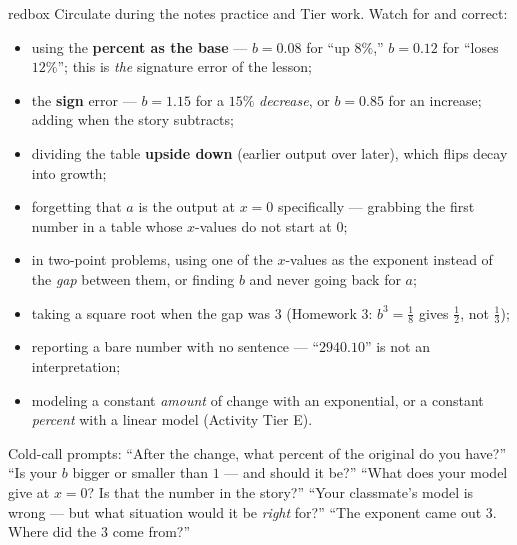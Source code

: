 \documentclass[10pt]{article}
\begin{document}
\begin{skillbox}{redbox}
Circulate during the notes practice and Tier work. Watch for and correct:
\begin{itemize}[leftmargin=1.2em, nosep]
  \item using the \textbf{percent as the base} --- $b=0.08$ for ``up $8\%$,'' $b=0.12$ for ``loses $12\%$''; this is \emph{the} signature error of the lesson;
  \item the \textbf{sign} error --- $b=1.15$ for a $15\%$ \emph{decrease}, or $b=0.85$ for an increase; adding when the story subtracts;
  \item dividing the table \textbf{upside down} (earlier output over later), which flips decay into growth;
  \item forgetting that $a$ is the output at $x=0$ specifically --- grabbing the first number in a table whose $x$-values do not start at $0$;
  \item in two-point problems, using one of the $x$-values as the exponent instead of the \emph{gap} between them, or finding $b$ and never going back for $a$;
  \item taking a square root when the gap was $3$ (Homework 3: $b^{3}=\frac18$ gives $\frac12$, not $\frac13$);
  \item reporting a bare number with no sentence --- ``$2940.10$'' is not an interpretation;
  \item modeling a constant \emph{amount} of change with an exponential, or a constant \emph{percent} with a linear model (Activity Tier E).
\end{itemize}
Cold-call prompts: ``After the change, what percent of the original do you have?'' ``Is your $b$ bigger
or smaller than $1$ --- and should it be?'' ``What does your model give at $x=0$? Is that the number
in the story?'' ``Your classmate's model is wrong --- but what situation would it be \emph{right}
for?'' ``The exponent came out $3$. Where did the $3$ come from?''
\end{skillbox}
\end{document}

